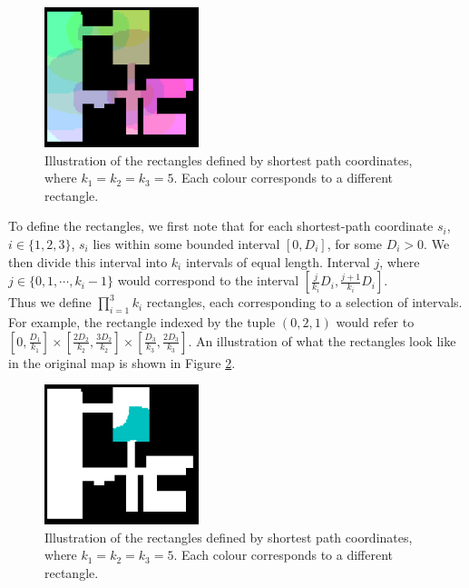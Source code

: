 \documentclass[letterpaper]{article}
\begin{document}
\begin{figure}[!h]
  \centering
    \includegraphics[width=170px]{diagrams/sprectangles.png}
  \caption{Illustration of the rectangles defined by shortest path coordinates, where $k_1 = k_2 = k_3 = 5$. Each colour corresponds to a different rectangle.}
  \label{fig:sprectangles}
\end{figure}

To define the rectangles, we first note that for each shortest-path coordinate $s_i$, $i \in \{1,2,3\}$, $s_i$ lies within some bounded interval $[0,D_i]$, for some $D_i > 0$. We then divide this interval into $k_i$ intervals of equal length. Interval $j$, where $j \in \{0,1,\cdots,k_i-1\}$ would correspond to the interval $[\frac{j}{k_i}D_i, \frac{j+1}{k_i}D_i]$.\\

Thus we define $\prod_{i=1}^3 k_i$ rectangles, each corresponding to a selection of intervals. For example, the rectangle indexed by the tuple $(0,2,1)$ would refer to $[0,\frac{D_1}{k_1}]\times [\frac{2D_2}{k_2},\frac{3D_2}{k_2}]\times [\frac{D_3}{k_3},\frac{2D_3}{k_3}]$. An illustration of what the rectangles look like in the original map is shown in Figure \ref{fig:sprectangles}.\\

\begin{figure}[!h]
  \centering
    \includegraphics[width=170px]{diagrams/spsinglerectangle.png}
  \caption{Illustration of the rectangles defined by shortest path coordinates, where $k_1 = k_2 = k_3 = 5$. Each colour corresponds to a different rectangle.}
  \label{fig:sprectangles}
\end{figure}
\end{document}
